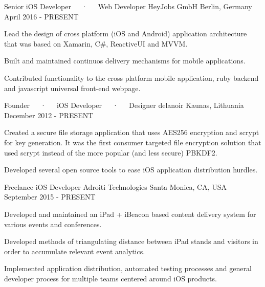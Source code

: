 

\begin{cventries}

  \cventry
    {Senior iOS Developer~~~·~~~Web Developer} %
    {HeyJobs GmbH} %
    {Berlin, Germany} %
    {April 2016 - PRESENT} %
    {
      \begin{cvitems} %
        \item {Lead the design of cross platform (iOS and Android) application architecture that was based on Xamarin, C\#, ReactiveUI and MVVM.}
        \item {Built and maintained continuos delivery mechanisms for mobile applications.}
        \item {Contributed functionality to the cross platform mobile application, ruby backend and javascript universal front-end webpage.}
      \end{cvitems}
    }

  \cventry
    {Founder~~~·~~~iOS Developer~~~·~~~Designer} %
    {delanoir} %
    {Kaunas, Lithuania} %
    {December 2012 - PRESENT} %
    {
      \begin{cvitems} %
        \item {Created a secure file storage application that uses AES256 encryption and scrypt for key generation. It was the first consumer targeted file encryption solution that used scrypt instead of the more popular (and less secure) PBKDF2.}
        \item {Developed several open source tools to ease iOS application distribution hurdles.}
      \end{cvitems}
    }

  \cventry
    {Freelance iOS Developer} %
    {Adroiti Technologies} %
    {Santa Monica, CA, USA} %
    {September 2015 - PRESENT} %
    {
      \begin{cvitems} %
        \item {Developed and maintained an iPad + iBeacon based content delivery system for various events and conferences.}
        \item {Developed methods of triangulating distance between iPad stands and visitors in order to accumulate relevant event analytics.}
        \item {Implemented application distribution, automated testing processes and general developer process for multiple teams centered around iOS products.}
      \end{cvitems}
    }


\end{cventries}
